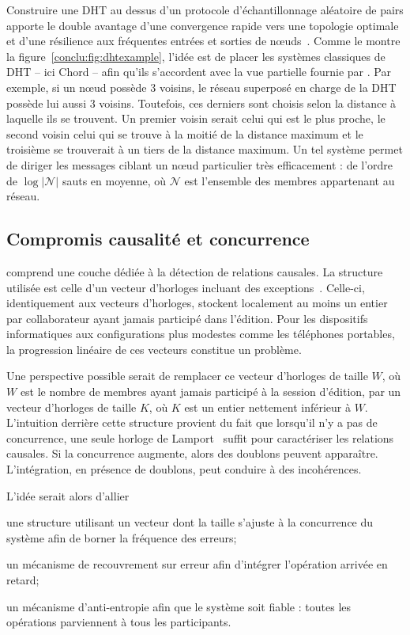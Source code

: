 Construire une DHT au dessus d'un protocole d'échantillonnage aléatoire de pairs
apporte le double avantage d'une convergence rapide vers une topologie optimale
et d'une résilience aux fréquentes entrées et sorties de
nœuds~\cite{krasikova2016distributed, montresor2005chord,
  voulgaris2013vicinity}.  Comme le montre la
figure~\ref{conclu:fig:dhtexample}, l'idée est de placer les systèmes classiques
de DHT -- ici Chord -- afin qu'ils s'accordent avec la vue partielle fournie par
\SPRAY. Par exemple, si un nœud \SPRAY possède 3 voisins, le réseau superposé en
charge de la DHT possède lui aussi 3 voisins. Toutefois, ces derniers sont
choisis selon la distance à laquelle ils se trouvent. Un premier voisin serait
celui qui est le plus proche, le second voisin celui qui se trouve à la moitié
de la distance maximum et le troisième se trouverait à un tiers de la distance
maximum. Un tel système permet de diriger les messages ciblant un nœud
particulier très efficacement : de l'ordre de $\log |\mathcal{N}|$ sauts en
moyenne, où $\mathcal{N}$ est l'ensemble des membres appartenant au réseau.

\subsection{Compromis causalité et concurrence}

\CRATE comprend une couche dédiée à la détection de relations causales. La
structure utilisée est celle d'un vecteur d'horloges incluant des
exceptions~\cite{malkhi2007concise}. Celle-ci, identiquement aux vecteurs
d'horloges, stockent localement au moins un entier par collaborateur ayant
jamais participé dans l'édition. Pour les dispositifs informatiques aux
configurations plus modestes comme les téléphones portables, la progression
linéaire de ces vecteurs constitue un problème.

Une perspective possible serait de remplacer ce vecteur d'horloges de taille
$W$, où $W$ est le nombre de membres ayant jamais participé à la session
d'édition, par un vecteur d'horloges de taille $K$, où $K$ est un entier
nettement inférieur à $W$. L'intuition derrière cette structure provient du fait
que lorsqu'il n'y a pas de concurrence, une seule horloge de
Lamport~\cite{lamport1978time} suffit pour caractériser les relations
causales. Si la concurrence augmente, alors des doublons peuvent
apparaître. L'intégration, en présence de doublons, peut conduire à des
incohérences.

L'idée serait alors d'allier
\begin{inparaenum}[(i)]
\item une structure utilisant un vecteur dont la taille s'ajuste à la
  concurrence du système afin de borner la fréquence des erreurs;
\item un mécanisme de recouvrement sur erreur afin d'intégrer l'opération
  arrivée en retard;
\item un mécanisme d'anti-entropie afin que le système soit fiable : toutes les
  opérations parviennent à tous les participants.
\end{inparaenum}

